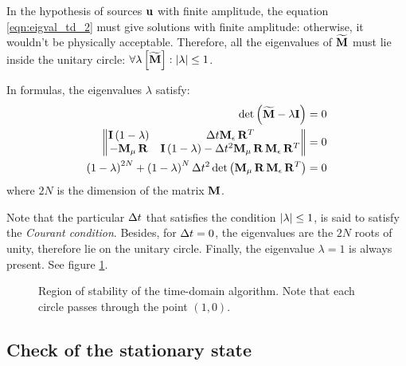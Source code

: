 In the hypothesis of sources $\mathbf{u}$ with finite amplitude, the
equation \eqref{eqn:eigval_td_2} must give solutions with finite
amplitude: otherwise, it wouldn't be physically acceptable. Therefore,
all the eigenvalues of $\widetilde{\mathbf{M}}$ must lie inside the unitary
circle: $\forall \lambda \left[\widetilde{\mathbf{M}}\right]: {\left\lvert\lambda\right\rvert}
\leq 1$.

In formulas, the eigenvalues $\lambda$ satisfy:
\begin{equation*} \begin{split}
    \det \left( \widetilde{\mathbf{M}} - \lambda \mathbf{I} \right) & = 0 \\
    \begin{Vmatrix} \mathbf{I}
      \left( 1-\lambda \right) & \Delta t
    {\mathbf{M}_\epsilon\,{\mathbf{R}}^T} \\
    -{\mathbf{M}_\mu\,\mathbf{R}} &
    \mathbf{I} \left( 1-\lambda \right) - \Delta t^2 {{{\mathbf{M}_\mu\,\mathbf{R}}\,\mathbf{M}_\epsilon}\,{\mathbf{R}}^T}
    \end{Vmatrix} & = 0 \\
    \left(1 - \lambda\right)^{2N} + \left( 1 - \lambda \right)^N \Delta t^2
    \det\left({{{\mathbf{M}_\mu\,\mathbf{R}}\,\mathbf{M}_\epsilon}\,{\mathbf{R}}^T}\right)
    & = 0
\end{split} \end{equation*}
where $2N$ is the dimension of the matrix $\mathbf{M}$.

Note that the particular $\Delta t$ that satisfies the condition
${\left\lvert\lambda\right\rvert} \leq 1$, is said to satisfy the \emph{Courant
  condition}. Besides, for $\Delta t = 0$, the eigenvalues are the
$2N$ roots of unity, therefore lie on the unitary circle. Finally, the
eigenvalue $\lambda = 1$ is always present. See figure
\ref{fig:stability_td}.

\begin{figure}[htbp]
  \begin{center}
    \resizebox{8cm}{!}{}
  \end{center}
  \caption{Region of stability of the time-domain algorithm. Note that
  each circle passes through the point $(1,0)$.}
  \label{fig:stability_td}
\end{figure}

\subsection{Check of the stationary state}

